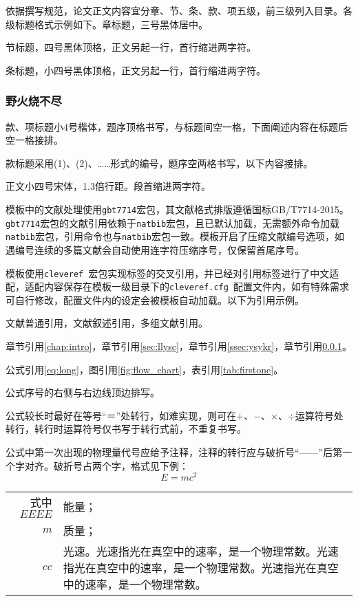 依据撰写规范，论文正文内容宜分章、节、条、款、项五级，前三级列入目录。各级标题格式示例如下。章标题，三号黑体居中。

\label{sec:llysc}
节标题，四号黑体顶格，正文另起一行，首行缩进两字符。

\label{ssec:ysykr}
条标题，小四号黑体顶格，正文另起一行，首行缩进两字符。
\subsubsection{野火烧不尽}\label{sssec:yhsbj}
款、项标题小4号楷体，题序顶格书写，与标题间空一格，下面阐述内容在标题后空一格接排。

款标题采用(1)、(2)、……形式的编号，题序空两格书写，以下内容接排。

正文小四号宋体，1.3倍行距。段首缩进两字符。

模板中的文献处理使用\verb|gbt7714|宏包，其文献格式排版遵循国标GB/T7714-2015。\verb|gbt7714|宏包的文献引用依赖于\verb|natbib|宏包，且已默认加载，无需额外命令加载\verb|natbib|宏包，引用命令也与\verb|natbib|宏包一致。模板开启了压缩文献编号选项，如遇编号连续的多篇文献会自动使用连字符压缩序号，仅保留首尾序号。

模板使用\verb|cleveref|~宏包实现标签的交叉引用，并已经对引用标签进行了中文适配，适配内容保存在模板一级目录下的\verb|cleveref.cfg|~配置文件内，如有特殊需求可自行修改，配置文件内的设定会被模板自动加载。以下为引用示例。

文献普通引用\cite{同鸣2012}，文献叙述引用\citet{Boutsidis2011}，多组文献引用\cite{同鸣2012, Lee1999, Tang2013, Ding2006Orthogonal}。

章节引用\cref{chap:intro}，章节引用\cref{sec:llysc}，章节引用\cref{ssec:ysykr}，章节引用\cref{sssec:yhsbj}。

公式引用\cref{eq:long}，图引用\cref{fig:flow_chart}，表引用\cref{tab:firstone}。

公式序号的右侧与右边线顶边排写。

公式较长时最好在等号“＝”处转行，如难实现，则可在$ + $、$ - $、$ \times $、$ \div $运算符号处转行，转行时运算符号仅书写于转行式前，不重复书写。

公式中第一次出现的物理量代号应给予注释，注释的转行应与破折号“——\nobreak”后第一个字对齐。破折号占两个字，格式见下例：
\begin{equation}\label{eq:norm}
E=mc^2
\end{equation}
\begin{flushleft}
    \begin{tabularx}{\textwidth}{@{}r@{~——~}X@{}}
        式中\hspace{\ccwd}$ EEEE $ & 能量； \\
        $ m $ & 质量； \\
        $ cc $ & 光速。光速指光在真空中的速率，是一个物理常数。光速指光在真空中的速率，是一个物理常数。光速指光在真空中的速率，是一个物理常数。
    \end{tabularx}
\end{flushleft}

